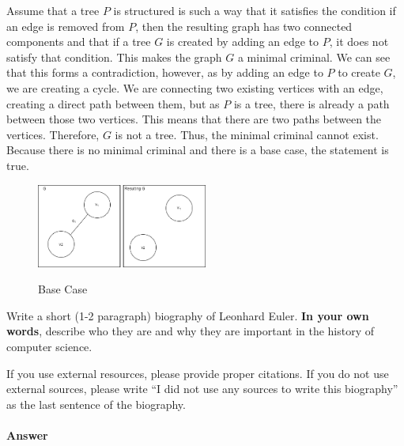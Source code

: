 \documentclass{article}
\begin{document}
	Assume that a tree $P$ is structured is such a way that it satisfies the condition if an edge is removed from $P$, then the resulting graph has 
	two connected components and that if a tree $G$ is created by adding an edge to $P$, it does not satisfy that condition. This makes the graph $G$ a
	minimal criminal. We can see that this forms a contradiction, however, as by adding an edge to $P$ to create $G$, we are creating a cycle. We are 
	connecting two existing vertices with an edge, creating a direct path between them, but as $P$ is a tree, there is already a path between those two vertices.
	This means that there are two paths between the vertices. Therefore, $G$ is not a tree. Thus, the minimal criminal cannot exist.
	Because there is no minimal criminal and there is a base case, the statement is true.

 \begin{figure}
\caption{Base Case}
\centering
\includegraphics[width=0.5\textwidth]{images/graphBaseCase}
\label{graph}
\end{figure}

\collab{\todo{}}

Write a short (1-2 paragraph) biography of Leonhard Euler.
\textbf{In your own words}, describe who they are and why they are important in
the history of computer science.

If you use external resources, please provide
proper citations. If you do not use external sources, please write ``I did not
use any sources to write this biography'' as the last sentence of the
biography.

\paragraph{Answer}


% 
% 
\end{document}
